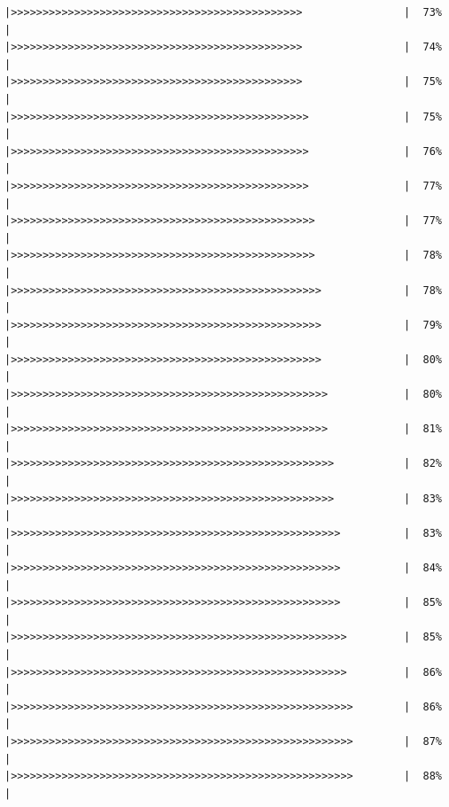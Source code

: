 \documentclass[
]{book}
\begin{document}
\begin{verbatim}
|>>>>>>>>>>>>>>>>>>>>>>>>>>>>>>>>>>>>>>>>>>>>>>                |  73%  |                                                                      |>>>>>>>>>>>>>>>>>>>>>>>>>>>>>>>>>>>>>>>>>>>>>>                |  74%  |                                                                      |>>>>>>>>>>>>>>>>>>>>>>>>>>>>>>>>>>>>>>>>>>>>>>                |  75%  |                                                                      |>>>>>>>>>>>>>>>>>>>>>>>>>>>>>>>>>>>>>>>>>>>>>>>               |  75%  |                                                                      |>>>>>>>>>>>>>>>>>>>>>>>>>>>>>>>>>>>>>>>>>>>>>>>               |  76%  |                                                                      |>>>>>>>>>>>>>>>>>>>>>>>>>>>>>>>>>>>>>>>>>>>>>>>               |  77%  |                                                                      |>>>>>>>>>>>>>>>>>>>>>>>>>>>>>>>>>>>>>>>>>>>>>>>>              |  77%  |                                                                      |>>>>>>>>>>>>>>>>>>>>>>>>>>>>>>>>>>>>>>>>>>>>>>>>              |  78%  |                                                                      |>>>>>>>>>>>>>>>>>>>>>>>>>>>>>>>>>>>>>>>>>>>>>>>>>             |  78%  |                                                                      |>>>>>>>>>>>>>>>>>>>>>>>>>>>>>>>>>>>>>>>>>>>>>>>>>             |  79%  |                                                                      |>>>>>>>>>>>>>>>>>>>>>>>>>>>>>>>>>>>>>>>>>>>>>>>>>             |  80%  |                                                                      |>>>>>>>>>>>>>>>>>>>>>>>>>>>>>>>>>>>>>>>>>>>>>>>>>>            |  80%  |                                                                      |>>>>>>>>>>>>>>>>>>>>>>>>>>>>>>>>>>>>>>>>>>>>>>>>>>            |  81%  |                                                                      |>>>>>>>>>>>>>>>>>>>>>>>>>>>>>>>>>>>>>>>>>>>>>>>>>>>           |  82%  |                                                                      |>>>>>>>>>>>>>>>>>>>>>>>>>>>>>>>>>>>>>>>>>>>>>>>>>>>           |  83%  |                                                                      |>>>>>>>>>>>>>>>>>>>>>>>>>>>>>>>>>>>>>>>>>>>>>>>>>>>>          |  83%  |                                                                      |>>>>>>>>>>>>>>>>>>>>>>>>>>>>>>>>>>>>>>>>>>>>>>>>>>>>          |  84%  |                                                                      |>>>>>>>>>>>>>>>>>>>>>>>>>>>>>>>>>>>>>>>>>>>>>>>>>>>>          |  85%  |                                                                      |>>>>>>>>>>>>>>>>>>>>>>>>>>>>>>>>>>>>>>>>>>>>>>>>>>>>>         |  85%  |                                                                      |>>>>>>>>>>>>>>>>>>>>>>>>>>>>>>>>>>>>>>>>>>>>>>>>>>>>>         |  86%  |                                                                      |>>>>>>>>>>>>>>>>>>>>>>>>>>>>>>>>>>>>>>>>>>>>>>>>>>>>>>        |  86%  |                                                                      |>>>>>>>>>>>>>>>>>>>>>>>>>>>>>>>>>>>>>>>>>>>>>>>>>>>>>>        |  87%  |                                                                      |>>>>>>>>>>>>>>>>>>>>>>>>>>>>>>>>>>>>>>>>>>>>>>>>>>>>>>        |  88%  |                                                                      
\end{verbatim}
\end{document}

